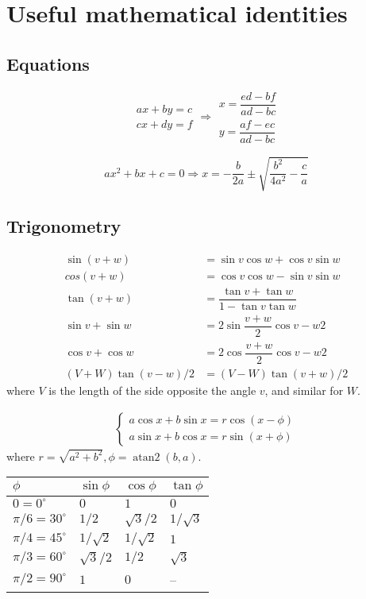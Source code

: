 
\chapter{Useful mathematical identities}

\section{Equations}
$$\begin{aligned}ax+by=c\\cx+dy=f\end{aligned}
\Rightarrow
\begin{aligned}x=\dfrac{ed-bf}{ad-bc}\\y=\dfrac{af-ec}{ad-bc}\end{aligned}$$

$$ax^2+bx+c=0 \Rightarrow x = -\frac{b}{2a}\pm\sqrt{\frac{b^2}{4a^2}-\frac{c}{a}}$$

\section{Trigonometry}
\begin{align*}
\sin(v+w)&{}=\sin v\cos w+\cos v\sin w\\
cos(v+w)&{}=\cos v\cos w-\sin v\sin w\\
\tan(v+w)&{}=\dfrac{\tan v+\tan w}{1-\tan v\tan w}\\
\sin v+\sin w&{}=2\sin\dfrac{v+w}{2}\cos{v-w}{2}\\
\cos v+\cos w&{}=2\cos\dfrac{v+w}{2}\cos{v-w}{2}\\
(V+W)\tan(v-w)/2&{}=(V-W)\tan(v+w)/2
\end{align*}
where $V$ is the length of the side opposite the angle $v$, and
similar for $W$.

\begin{align*}
\begin{cases}
a\cos x+b\sin x=r\cos(x-\phi)\\
a\sin x+b\cos x=r\sin(x+\phi)
\end{cases}
\end{align*}
where $r=\sqrt{a^2+b^2}, \phi=\operatorname{atan2}(b,a)$.

\begin{center}
\begin{tabular}{|l|l|l|l|}
\hline
$\phi$ & $\sin\phi$ & $\cos\phi$ & $\tan\phi$ \\
\hline
$0 = 0^\circ$ & $0$ & $1$ & $0$\\
\hline
$\pi/6 = 30^\circ$ & $1/2$ & $\sqrt3/2$ & $1/\sqrt3$\\
\hline
$\pi/4 = 45^\circ$ & $1/\sqrt2$ & $1/\sqrt2$ & $1$\\
\hline
$\pi/3 = 60^\circ$ & $\sqrt3/2$ & $1/2$ & $\sqrt3$\\
\hline
$\pi/2 = 90^\circ$ & $1$ & $0$ & --\\
\hline
\end{tabular}
\end{center}

